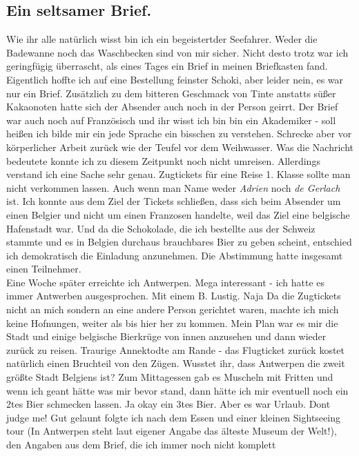 \documentclass{article}
\begin{document}
\subsection{
  Ein seltsamer Brief.
}
\noindent 
Wie ihr alle natürlich wisst bin ich ein begeistertder Seefahrer. Weder die
Badewanne noch das Waschbecken sind von mir sicher. Nicht desto trotz war ich geringfügig überrascht, als eines
Tages ein Brief in meinen Briefkasten fand. Eigentlich hoffte ich auf eine Bestellung feinster Schoki, aber
leider nein,
es war nur ein Brief. Zusätzlich zu dem bitteren Geschmack von Tinte anstatts süßer Kakaonoten hatte sich der
Absender auch noch in der Person geirrt. Der Brief war auch noch auf Französisch und ihr wisst ich bin bin ein
Akademiker - soll heißen ich bilde mir ein jede Sprache ein bisschen zu verstehen. Schrecke aber vor
körperlicher Arbeit zurück wie der Teufel vor dem Weihwasser. Was die Nachricht bedeutete konnte ich zu diesem
Zeitpunkt noch nicht umreisen. Allerdings verstand ich eine Sache sehr genau. Zugtickets für eine Reise 1.
Klasse sollte man nicht verkommen lassen. Auch wenn man Name weder \textit{Adrien} noch \textit{de Gerlach} ist.
Ich konnte aus dem Ziel der Tickets schließen, dass sich beim Absender um einen Belgier und nicht um einen
Franzosen handelte, weil das Ziel eine belgische Hafenstadt war. Und da die Schokolade, die ich bestellte aus
der Schweiz stammte und es in Belgien durchaus brauchbares Bier zu geben scheint, entschied ich demokratisch die
Einladung anzunehmen. Die Abstimmung hatte insgesamt einen Teilnehmer.
\\
\noindent 
Eine Woche später erreichte ich Antwerpen. Mega interessant - ich hatte es immer Antwerben ausgesprochen. Mit
einem B. Lustig. Naja Da die Zugtickets nicht an mich sondern an eine andere Person gerichtet waren, machte ich
mich keine Hofnungen, weiter als bis hier her zu kommen. Mein Plan war es mir die Stadt und einige belgische
Bierkrüge von innen anzusehen und dann wieder zurück zu reisen. Traurige Annektodte am Rande - das Flugticket
zurück kostet natürlich einen Bruchteil von den Zügen. Wusstet ihr, dass Antwerpen die zweit größte Stadt
Belgiens ist? Zum Mittagessen gab es Muscheln mit Fritten und wenn ich geant hätte was mir bevor stand, dann
hätte ich mir eventuell noch ein 2tes Bier schmecken lassen. Ja okay ein 3tes Bier. Aber es war Urlaub. Dont
judge me! Gut gelaunt folgte ich nach dem Essen und einer kleinen Sightseeing tour (In Antwerpen steht laut
eigener Angabe das älteste Museum der Welt!), den Angaben aus dem Brief, die ich immer noch nicht komplett
\end{document}
